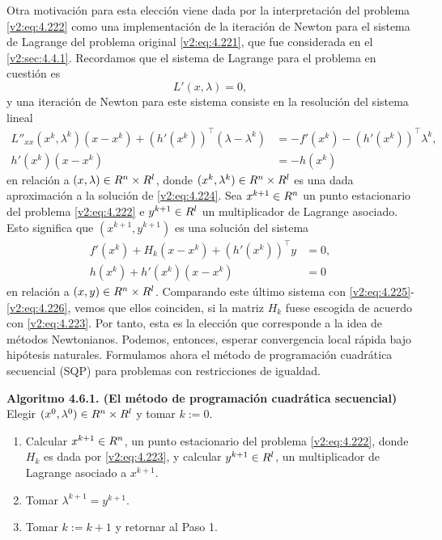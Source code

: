 Otra motivación para esta elección viene dada por la interpretación del problema \eqref{v2:eq:4.222} como una implementación de la iteración de Newton para el sistema de Lagrange del problema original \eqref{v2:eq:4.221}, que fue considerada en el \cref{v2:sec:4.4.1}. Recordamos que el sistema de Lagrange para el problema en cuestión es
\begin{equation}
    L'(x, \lambda) = 0,
    \label{v2:eq:4.224}
\end{equation}
y una iteración de Newton para este sistema consiste en la resolución del sistema lineal
\begin{align}
    L''_{xx}(x^k, \lambda^k)(x - x^k) + (h'(x^k))^\top(\lambda - \lambda^k) &= -f'(x^k) - (h'(x^k))^\top \lambda^k, \label{v2:eq:4.225} \\
    h'(x^k)(x - x^k) &= -h(x^k) \label{v2:eq:4.226}
\end{align}
en relación a $(x, \lambda) \in R^n \times R^l$, donde $(x^k, \lambda^k) \in R^n \times R^l$ es una dada aproximación a la solución de \eqref{v2:eq:4.224}.
Sea $x^{k+1} \in R^n$ un punto estacionario del problema \eqref{v2:eq:4.222} e $y^{k+1} \in R^l$ un multiplicador de Lagrange asociado. Esto significa que $(x^{k+1}, y^{k+1})$ es una solución del sistema
\begin{align*}
    f'(x^k) + H_k(x - x^k) + (h'(x^k))^\top y &= 0, \\
    h(x^k) + h'(x^k)(x - x^k) &= 0
\end{align*}
en relación a $(x, y) \in R^n \times R^l$. Comparando este último sistema con \eqref{v2:eq:4.225}-\eqref{v2:eq:4.226}, vemos que ellos coinciden, si la matriz $H_k$ fuese escogida de acuerdo con \eqref{v2:eq:4.223}. Por tanto, esta es la elección que corresponde a la idea de métodos Newtonianos. Podemos, entonces, esperar convergencia local rápida bajo hipótesis naturales.
Formulamos ahora el método de programación cuadrática secuencial (SQP) para problemas con restricciones de igualdad.

\noindent \textbf{Algoritmo 4.6.1. (El método de programación cuadrática secuencial)} \\
Elegir $(x^0, \lambda^0) \in R^n \times R^l$ y tomar $k := 0$.
\begin{enumerate}
    \item Calcular $x^{k+1} \in R^n$, un punto estacionario del problema \eqref{v2:eq:4.222}, donde $H_k$ es dada por \eqref{v2:eq:4.223}, y calcular $y^{k+1} \in R^l$, un multiplicador de Lagrange asociado a $x^{k+1}$.
    \item Tomar $\lambda^{k+1} = y^{k+1}$.
    \item Tomar $k := k + 1$ y retornar al Paso 1.
\end{enumerate}

